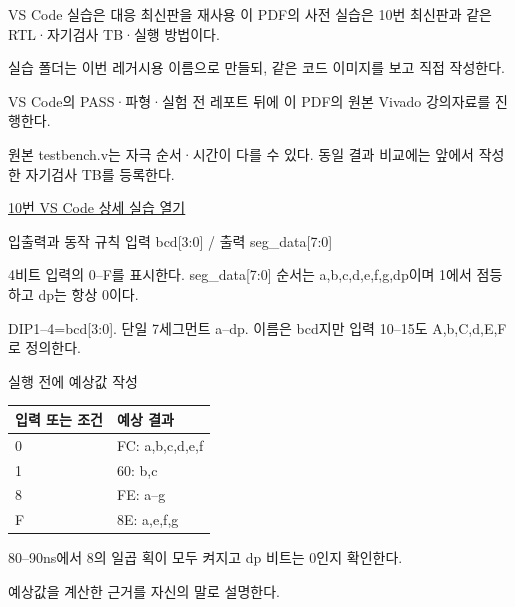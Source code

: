 \begin{frame}{VS Code 실습은 대응 최신판을 재사용}\relax
\small
이 PDF의 사전 실습은 10번 최신판과 같은 RTL·자기검사 TB·실행 방법이다.\par\vspace{0.22cm}실습 폴더는 이번 레거시용 이름으로 만들되, 같은 코드 이미지를 보고 직접 작성한다.\par\vspace{0.22cm}VS Code의 PASS·파형·실험 전 레포트 뒤에 이 PDF의 원본 Vivado 강의자료를 진행한다.\par\vspace{0.22cm}원본 testbench.v는 자극 순서·시간이 다를 수 있다. 동일 결과 비교에는 앞에서 작성한 자기검사 TB를 등록한다.\par\href{04.LAB1_10_SEVEN_SEGMENT_VIVADO.pdf}{10번 VS Code 상세 실습 열기}
\end{frame}

\begin{frame}[label=legacy-10-sim]{입출력과 동작 규칙}\relax
\small
입력 bcd[3:0] / 출력 seg\_data[7:0]\par\vspace{0.22cm}4비트 입력의 0–F를 표시한다. seg\_data[7:0] 순서는 a,b,c,d,e,f,g,dp이며 1에서 점등하고 dp는 항상 0이다.\par\vspace{0.22cm}DIP1–4=bcd[3:0]. 단일 7세그먼트 a–dp. 이름은 bcd지만 입력 10–15도 A,b,C,d,E,F로 정의한다.\par
\end{frame}

\begin{frame}{실행 전에 예상값 작성}\relax
\small
\begin{center}\renewcommand{\arraystretch}{1.45}
\begin{tabular}{l|l}
입력 또는 조건 & 예상 결과\\\hline
0 & FC: a,b,c,d,e,f\\
1 & 60: b,c\\
8 & FE: a–g\\
F & 8E: a,e,f,g\\
\end{tabular}\end{center}
80–90ns에서 8의 일곱 획이 모두 켜지고 dp 비트는 0인지 확인한다.\par\vspace{0.22cm}예상값을 계산한 근거를 자신의 말로 설명한다.\par
\end{frame}


